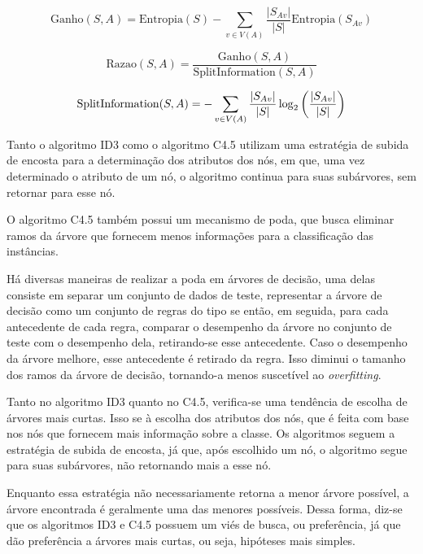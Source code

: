 \documentclass{article}
\begin{document}
\small
\begin{equation}
\mathrm{Ganho}(S,A)=\mathrm{Entropia}(S)-\sum_{v \in V(A)}\frac{\left|S_{Av}\right|}{\left|S\right|} \mathrm{Entropia}(S_{Av})
\end{equation}

\begin{equation}
\mathrm{Razao}(S,A)=\frac{\mathrm{Ganho}(S,A)}{\mathrm{SplitInformation}(S,A)}
\end{equation}

\begin{equation}
{\tiny \mathrm{SplitInformation}(S,A) = -\sum_{v\in V(A)} \frac{\left|S_{Av}\right|}{\left|S\right|} \log_2\left(\frac{\left|S_{Av}\right|}{\left|S\right|}\right)}
\end{equation}
\normalsize

Tanto o algoritmo ID3 como o algoritmo C4.5 utilizam uma estratégia de subida de encosta para a determinação dos atributos dos nós, em que, uma vez determinado o atributo de um nó, o algoritmo continua para suas subárvores, sem retornar para esse nó.

O algoritmo C4.5 também possui um mecanismo de poda, que busca eliminar ramos da árvore que fornecem menos informações para a classificação das instâncias.

Há diversas maneiras de realizar a poda em árvores de decisão, uma delas consiste em separar um conjunto de dados de teste, representar a árvore de decisão como um conjunto de regras do tipo se então, em seguida, para cada antecedente de cada regra, comparar o desempenho da árvore no conjunto de teste com o desempenho dela, retirando-se esse antecedente. Caso o desempenho da árvore melhore, esse antecedente é retirado da regra. Isso diminui o tamanho dos ramos da árvore de decisão, tornando-a menos suscetível ao {\it overfitting}.

Tanto no algoritmo ID3 quanto no C4.5, verifica-se uma tendência de escolha de árvores mais curtas. Isso se à escolha dos atributos dos nós, que é feita com base nos nós que fornecem mais informação sobre a classe. Os algoritmos seguem a estratégia de subida de encosta, já que, após escolhido um nó, o algoritmo segue para suas subárvores, não retornando mais a esse nó.

Enquanto essa estratégia não necessariamente retorna a menor árvore possível, a árvore encontrada é geralmente uma das menores possíveis. Dessa forma, diz-se que os algoritmos ID3 e C4.5 possuem um viés de busca, ou preferência, já que dão preferência a árvores mais curtas, ou seja, hipóteses mais simples. 
\end{document}
